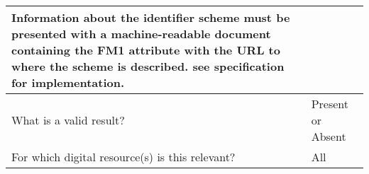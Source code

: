 \documentclass[english]{article}
\begin{document}
\begin{longtable}{|p{5cm}|p{9cm}|}
Information about the identifier scheme must be presented with a machine-readable document containing the FM1 attribute with the URL to where the scheme is described.  see specification for implementation.
\\



\hline
What is a valid result? &  
Present or Absent
\\



\hline
For which digital resource(s) is this relevant? &  All\\



\end{longtable}




\newpage

\centering
\end{document}
